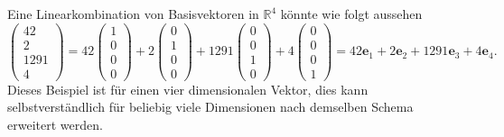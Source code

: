 \begin{beispiel}
Eine Linearkombination von Basisvektoren in $\mathbb{R}^4$ könnte wie folgt aussehen
    \begin{equation}
        \begin{pmatrix} 
        42 \\ 2 \\ 1291 \\ 4    
        \end{pmatrix} 
        = 
        42 \begin{pmatrix}
        1 \\ 0 \\ 0 \\ 0 
        \end{pmatrix} 
        +
        2 \begin{pmatrix} 
        0 \\ 1 \\ 0 \\ 0 
        \end{pmatrix}
        +
        1291 
        \begin{pmatrix} 
        0 \\ 0 \\ 1 \\ 0 
        \end{pmatrix} 
        +
        4 \begin{pmatrix} 
        0 \\ 0 \\ 0 \\ 1 
        \end{pmatrix} 
        = 
        42\textbf{e}_1
        + 
        2\textbf{e}_2
        + 
        1291\textbf{e}_3
        + 
        4\textbf{e}_4.
    \end{equation}
Dieses Beispiel ist für einen vier dimensionalen Vektor, dies kann selbstverständlich für beliebig viele Dimensionen nach demselben Schema erweitert werden.
\end{beispiel}
